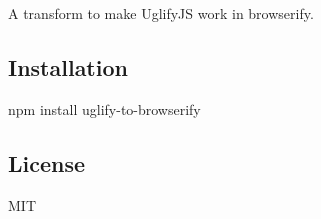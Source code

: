 A transform to make Uglify\+JS work in browserify.

\href{https://travis-ci.org/ForbesLindesay/uglify-to-browserify}{\tt } \href{https://gemnasium.com/ForbesLindesay/uglify-to-browserify}{\tt } \href{http://badge.fury.io/js/uglify-to-browserify}{\tt }

\subsection*{Installation}

\begin{DoxyVerb}npm install uglify-to-browserify
\end{DoxyVerb}


\subsection*{License}

M\+IT 